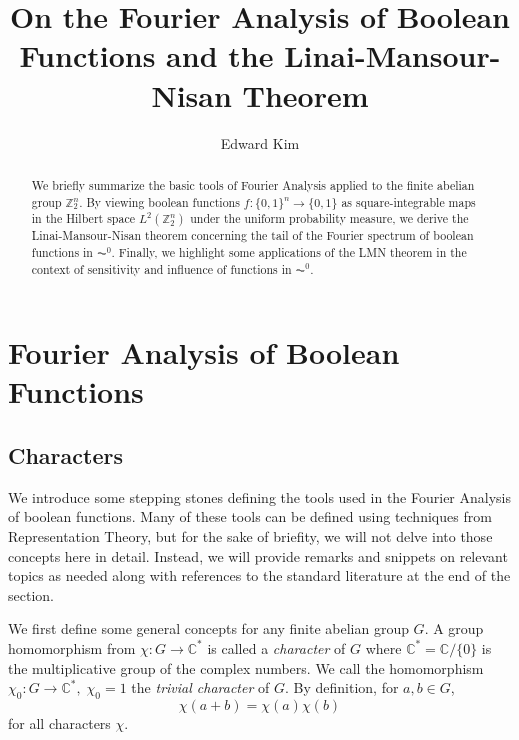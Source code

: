\documentclass{amsart}
\theoremstyle{definition}
\theoremstyle{remark}
\numberwithin{equation}{section}
\begin{document}
\title{On the Fourier Analysis of Boolean Functions and the Linai-Mansour-Nisan Theorem}

\author{Edward Kim}

\begin{abstract}
  We briefly summarize the basic tools of Fourier Analysis applied to the finite abelian group $\mathbb{Z}_2^n$. By viewing boolean functions $f:\{0,1\}^n \rightarrow \{0,1\}$ as square-integrable maps in the Hilbert space $L^2(\mathbb{Z}_2^n)$ under the uniform probability measure, we derive the Linai-Mansour-Nisan theorem concerning the tail of the Fourier spectrum of boolean functions in $\AC^0$. Finally, we highlight some applications of the LMN theorem in the context of sensitivity and influence of functions in $\AC^0$.
\end{abstract}

\maketitle

\section{Fourier Analysis of Boolean Functions}

\subsection{Characters}

We introduce some stepping stones defining the tools used in the Fourier Analysis of boolean functions. Many of these tools can be defined using techniques from Representation Theory, but for the sake of briefity, we will not delve into those concepts here in detail. Instead, we will provide remarks and snippets on relevant topics as needed along with references to the standard literature at the end of the section.  \newline

We first define some general concepts for any finite abelian group $G$. A group homomorphism from $\chi: G \rightarrow \mathbb{C}^*$ is called a \emph{character} of $G$ where $\mathbb{C}^* = \mathbb{C}/\{0\}$ is the multiplicative group of the complex numbers. We call the homomorphism $\chi_0:G \rightarrow \mathbb{C}^*, \; \chi_0 = 1$ the \emph{trivial character} of $G$. By definition, for $a,b \in G$,
\begin{equation} \label{homo}
\chi(a + b) = \chi(a)\chi(b)
\end{equation}
for all characters $\chi$. \newline
\end{document}

